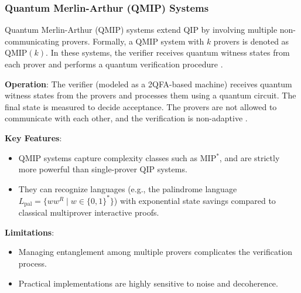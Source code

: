 \subsubsection{Quantum Merlin-Arthur (QMIP) Systems}
\label{sssec:qmip}
\begin{definition}
Quantum Merlin-Arthur (QMIP) systems extend QIP by involving multiple non-communicating provers. Formally, a QMIP system with \( k \) provers is denoted as \(\text{QMIP}(k)\). In these systems, the verifier receives quantum witness states from each prover and performs a quantum verification procedure \cite{scegulnaja2010postselection, yamakami2014constant}.
\end{definition}

\textbf{Operation}: The verifier (modeled as a 2QFA-based machine) receives quantum witness states from the provers and processes them using a quantum circuit. The final state is measured to decide acceptance. The provers are not allowed to communicate with each other, and the verification is non-adaptive \cite{scegulnaja2010postselection}.

\textbf{Key Features}:
\begin{itemize}
    \item QMIP systems capture complexity classes such as MIP\(^*\), and are strictly more powerful than single-prover QIP systems.
    \item They can recognize languages (e.g., the palindrome language \( L_{\text{pal}} = \{ww^R \mid w \in \{0,1\}^*\} \)) with exponential state savings compared to classical multiprover interactive proofs.
\end{itemize}

\textbf{Limitations}:
\begin{itemize}
    \item Managing entanglement among multiple provers complicates the verification process.
    \item Practical implementations are highly sensitive to noise and decoherence.
\end{itemize}
